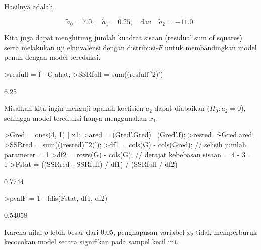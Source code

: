 \documentclass[a4paper,11pt,oneside,enabledeprecatedfontcommands]{scrbook}
\newenvironment{eulernotebook}{}{}
\newenvironment{eulercomment}{\par\medskip\noindent}{\par\medskip}
\newenvironment{eulerformula}{}{}
\begin{document}
\begin{eulernotebook}
\begin{eulercomment}
			Hasilnya adalah
		\end{eulercomment}
		\begin{eulerformula}
			\[
			\tilde{a}_0 = 7.0, \quad \tilde{a}_1 = 0.25, \quad \text{dan} \quad \tilde{a}_2 = -11.0.
			\]
		\end{eulerformula}
		\begin{eulercomment}
			Kita juga dapat menghitung jumlah kuadrat sisaan (residual sum of squares) serta melakukan uji
			ekuivalensi dengan distribusi-$F$ untuk membandingkan model penuh dengan model tereduksi.
		\end{eulercomment}
		\begin{eulerprompt}
			>resfull = f - G.ahat;
			>SSRfull = sum((resfull^2)')
		\end{eulerprompt}
		\begin{euleroutput}
			6.25
		\end{euleroutput}
		\begin{eulercomment}
			Misalkan kita ingin menguji apakah koefisien $a_2$ dapat diabaikan ($H_0: a_2 = 0$), sehingga model
			tereduksi hanya menggunakan $x_1$.
		\end{eulercomment}
		\begin{eulerprompt}
			>Gred = ones(4, 1) | x1;
			>ared = (Gred'.Gred) \ (Gred'.f);
			>resred=f-Gred.ared;
			>SSRred = sum(((resred)^2)');
			>df1 = cols(G) - cols(Gred); // selisih jumlah parameter = 1
			>df2 = rows(G) - cols(G); // derajat kebebasan sisaan = 4 - 3 = 1
			>Fstat = ((SSRred - SSRfull) / df1) / (SSRfull / df2)
		\end{eulerprompt}
		\begin{euleroutput}
			0.7744
		\end{euleroutput}
		\begin{eulerprompt}
			>pvalF = 1 - fdis(Fstat, df1, df2)
		\end{eulerprompt}
		\begin{euleroutput}
			0.54058
		\end{euleroutput}
		\begin{eulercomment}
			Karena nilai-$p$ lebih besar dari 0.05, penghapusan variabel $x_2$ tidak memperburuk kecocokan model
			secara signifikan pada sampel kecil ini.
		\end{eulercomment}
		

\end{eulernotebook}
\end{document}
